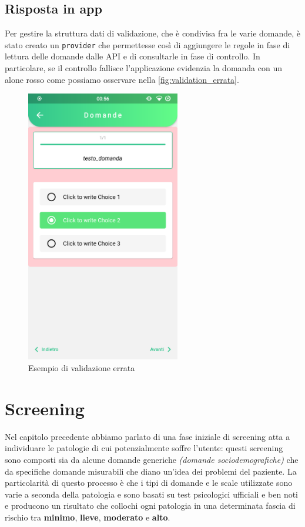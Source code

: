 \subsection{Risposta in app}
Per gestire la struttura dati di validazione, che è condivisa fra le varie domande, è stato creato un \texttt{provider} che permettesse così di aggiungere le regole in fase di lettura delle domande dalle API e di consultarle in fase di controllo. In particolare, se il controllo fallisce l'applicazione evidenzia la domanda con un alone rosso come possiamo osservare nella \autoref{fig:validation_errata}.

\begin{figure}[h!]
\centering
\includegraphics[width=0.6\textwidth]{img/validation_errata}
\caption{Esempio di validazione errata}
\label{fig:validation_errata}
\end{figure}

\section{Screening}
Nel capitolo precedente abbiamo parlato di una fase iniziale di screening atta a individuare le patologie di cui potenzialmente soffre l'utente: questi screening sono composti sia da alcune domande generiche \textit{(domande sociodemografiche)} che da specifiche domande misurabili che diano un'idea dei problemi del paziente. La particolarità di questo processo è che i tipi di domande e le scale utilizzate sono varie a seconda della patologia e sono basati su test psicologici ufficiali e ben noti e producono un risultato che collochi ogni patologia in una determinata fascia di rischio tra \textbf{minimo}, \textbf{lieve}, \textbf{moderato} e \textbf{alto}.

